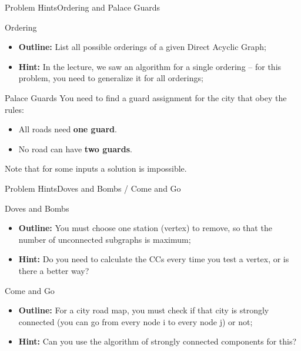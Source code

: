\begin{frame}{Problem Hints}{Ordering and Palace Guards}
  \begin{block}{Ordering}
    \begin{itemize}
      \item {\bf Outline:} List all possible orderings of a given Direct Acyclic Graph;
      \item {\bf Hint:} In the lecture, we saw an algorithm for a single ordering -- for this problem, you need to generalize it for all orderings;
    \end{itemize}
  \end{block}

  \begin{block}{Palace Guards}
    You need to find a guard assignment for the city that obey the rules:
    \begin{itemize}
      \item All roads need {\bf one guard}.
      \item No road can have {\bf two guards}.
    \end{itemize}\bigskip

    Note that for some inputs a solution is impossible.
  \end{block}
\end{frame}

\begin{frame}{Problem Hints}{Doves and Bombs / Come and Go}
    \begin{block}{Doves and Bombs}
      \begin{itemize}
        \item {\bf Outline:} You must choose one station (vertex) to remove, so that the number of unconnected subgraphs is maximum;
        \item {\bf Hint:} Do you need to calculate the CCs every time you test a vertex, or is there a better way?
      \end{itemize}
    \end{block}

    \begin{block}{Come and Go}
      \begin{itemize}
        \item {\bf Outline:} For a city road map, you must check if that city is strongly connected (you can go from every node i to every node j) or not;
        \item {\bf Hint:} Can you use the algorithm of strongly connected components for this?
      \end{itemize}
    \end{block}
\end{frame}

